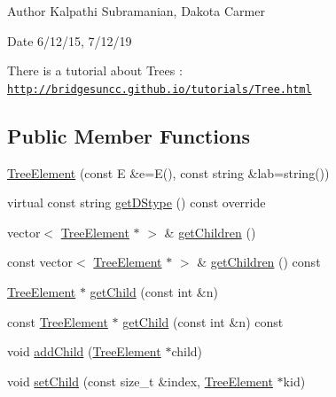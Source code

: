 \begin{DoxyAuthor}{Author}
Kalpathi Subramanian, Dakota Carmer 
\end{DoxyAuthor}
\begin{DoxyDate}{Date}
6/12/15, 7/12/19
\end{DoxyDate}
There is a tutorial about Trees \+: \href{http://bridgesuncc.github.io/tutorials/Tree.html}{\tt http\+://bridgesuncc.\+github.\+io/tutorials/\+Tree.\+html} \subsection*{Public Member Functions}
\begin{DoxyCompactItemize}
\item 
\mbox{\hyperlink{classbridges_1_1datastructure_1_1_tree_element_a0d719458938ba46a509635591ba2290b}{Tree\+Element}} (const E \&e=E(), const string \&lab=string())
\item 
virtual const string \mbox{\hyperlink{classbridges_1_1datastructure_1_1_tree_element_a897f34ea284da45e1dc869c3e3b6c9a4}{get\+D\+Stype}} () const override
\item 
vector$<$ \mbox{\hyperlink{classbridges_1_1datastructure_1_1_tree_element}{Tree\+Element}} $\ast$ $>$ \& \mbox{\hyperlink{classbridges_1_1datastructure_1_1_tree_element_a3ea19ec0178ceb531a707d87d6fd42d3}{get\+Children}} ()
\item 
const vector$<$ \mbox{\hyperlink{classbridges_1_1datastructure_1_1_tree_element}{Tree\+Element}} $\ast$ $>$ \& \mbox{\hyperlink{classbridges_1_1datastructure_1_1_tree_element_a1fc634a6eaab3800f925429ace209469}{get\+Children}} () const
\item 
\mbox{\hyperlink{classbridges_1_1datastructure_1_1_tree_element}{Tree\+Element}} $\ast$ \mbox{\hyperlink{classbridges_1_1datastructure_1_1_tree_element_a7b4c553cd11b169fa4ab5c3dacc371a1}{get\+Child}} (const int \&n)
\item 
const \mbox{\hyperlink{classbridges_1_1datastructure_1_1_tree_element}{Tree\+Element}} $\ast$ \mbox{\hyperlink{classbridges_1_1datastructure_1_1_tree_element_a858d9ce29eb7256d058e8ee2daf4ef4f}{get\+Child}} (const int \&n) const
\item 
void \mbox{\hyperlink{classbridges_1_1datastructure_1_1_tree_element_a4c05db5e970707e1421fe664bc4ef3b7}{add\+Child}} (\mbox{\hyperlink{classbridges_1_1datastructure_1_1_tree_element}{Tree\+Element}} $\ast$child)
\item 
void \mbox{\hyperlink{classbridges_1_1datastructure_1_1_tree_element_ad894ec5edfa66ddf59dd83a8712b48f1}{set\+Child}} (const size\+\_\+t \&index, \mbox{\hyperlink{classbridges_1_1datastructure_1_1_tree_element}{Tree\+Element}} $\ast$kid)
\end{DoxyCompactItemize}
